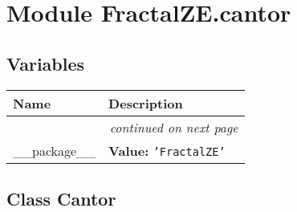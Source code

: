 %
%
%


\section{Module FractalZE.cantor}

    \label{FractalZE:cantor}


  \subsection{Variables}

    \vspace{-1cm}
\hspace{\varindent}\begin{longtable}{|p{\varnamewidth}|p{\vardescrwidth}|l}
\cline{1-2}
\cline{1-2} \centering \textbf{Name} & \centering \textbf{Description}& \\
\cline{1-2}
\endhead\cline{1-2}\multicolumn{3}{r}{\small\textit{continued on next page}}\\\endfoot\cline{1-2}
\endlastfoot\raggedright \_\-\_\-p\-a\-c\-k\-a\-g\-e\-\_\-\_\- & \raggedright \textbf{Value:} 
{\tt \texttt{'}\texttt{FractalZE}\texttt{'}}&\\
\cline{1-2}
\end{longtable}



\subsection{Class Cantor}

